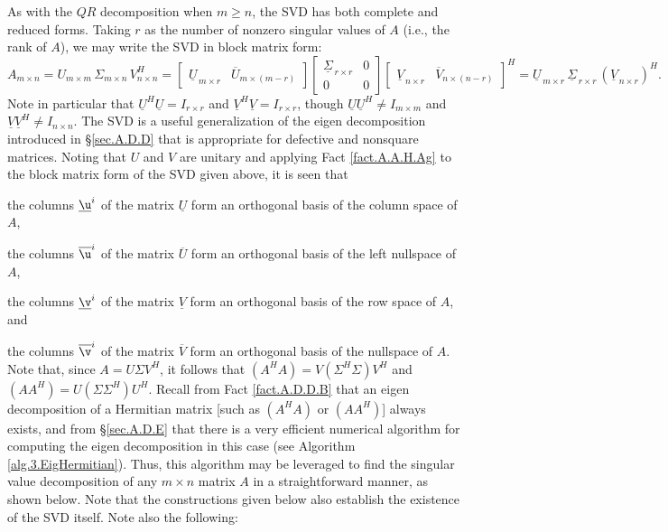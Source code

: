 As with the $QR$ decomposition when $m\ge n$, the SVD has both
complete and reduced forms.  Taking $r$ as the number of nonzero singular
values of $A$ (i.e., the rank of $A$), we may write the SVD in block
matrix form:
\begin{equation}
  A_{m\times n}=U_{m\times m} \,\Sigma_{m\times n} \,V^{H}_{n\times n} = 
  \begin{bmatrix} {\underline U}_{\,m \times r} & {\overline U}_{m \times (m-r)} \end{bmatrix}
  \begin{bmatrix} {\underline{\Sigma}}_{\,r \times r} & 0 \\ 
		  0 & 0 \end{bmatrix}
  \begin{bmatrix} {\underline V}_{\,n \times r} & {\overline V}_{n \times (n-r)} \end{bmatrix}^{H}
      ={\underline U}_{\,m\times r} \,{\underline{\Sigma}}_{\,r\times r} \,({\underline V}_{\,n\times r})^{H}. \label{SVDforms}
\end{equation}
Note in particular that $\underline U^H \underline U=I_{r\times r}$ and $\underline V^H \underline V=I_{r\times r}$,
though $\underline U \underline U^H \ne I_{m\times m}$ and $\underline V \underline V^H \ne I_{n\times n}$.
The SVD is a useful generalization of the eigen decomposition
introduced in \S \ref{sec.A.D.D} that is appropriate for defective and
nonsquare matrices.  Noting that $U$ and $V$ are unitary and applying
Fact \ref{fact.A.A.H.Ag} to the block matrix form of the SVD given
above, it is seen that
\beginmylistb
\item the columns $\underline\u^i$ of the matrix $\underline U$ form an orthogonal basis of the column space of $A$,
\item the columns $\overline\u^i$ of the matrix $\overline U$ form an orthogonal basis of the left nullspace of $A$,
\item the columns $\underline\v^i$ of the matrix $\underline V$ form an orthogonal basis of the row space of $A$, and
\item the columns $\overline\v^i$ of the matrix $\overline V$ form an orthogonal basis of the nullspace of $A$.
\endmylist
Note that, since $A=U \Sigma V^{H}$, it follows that $(A^{H}
A)=V (\Sigma^{H}\Sigma) V^{H}$ and $(A A^{H})=U (\Sigma\Sigma^{H})
U^{H}$.  Recall from Fact \ref{fact.A.D.D.B} that an eigen decomposition
of a Hermitian matrix [such as $(A^{H} A)$ or $(A
A^{H})$] always exists, and from \S \ref{sec.A.D.E} that there is a very efficient numerical algorithm for
computing the eigen decomposition in this case (see Algorithm \ref{alg.3.EigHermitian}).  Thus, this algorithm may be leveraged
to find the singular value decomposition of any $m\times n$ matrix $A$
in a straightforward manner, as shown below.  Note that the
constructions given below also establish the existence of the SVD
itself.  Note also the following:

